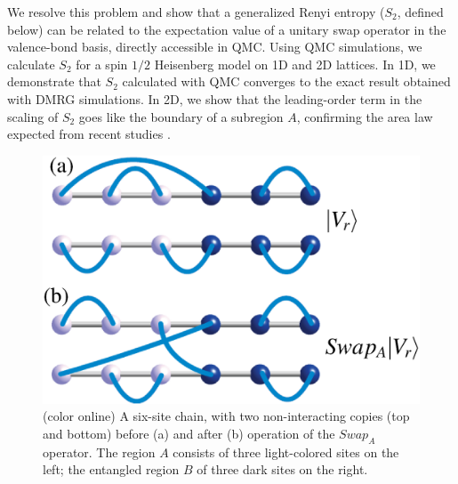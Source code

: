 \documentclass[prl,aps,twocolumn,floatfix,amsmath,amssymb,superscriptaddress,tightenlines]{revtex4}
\begin{document}

We resolve this problem and show that a generalized Renyi entropy ($S_2$, defined below) can be related to the expectation
value of a unitary swap operator in the valence-bond basis,
directly accessible in QMC.
Using QMC simulations, we calculate $S_2$ for a spin $1/2$ Heisenberg model
on 1D and 2D lattices.  In 1D, we demonstrate that $S_2$ calculated with QMC converges to the exact result obtained with DMRG simulations.  In 2D, we show that the leading-order term in the scaling of $S_2$ goes like the boundary of a subregion $A$, 
confirming the area law expected from recent studies \cite{Ann}.

\begin{figure} {
\includegraphics[width=2.4
in]{swap_2.eps} \caption{(color online) 
\label{swap_2}
A six-site chain, with two non-interacting copies (top and bottom) before (a) and after (b) operation of the $Swap_A$ operator.  
The region $A$ consists of three light-colored sites on the left; the entangled region $B$ of three dark sites on the right.
}
} \end{figure}
\end{document}
